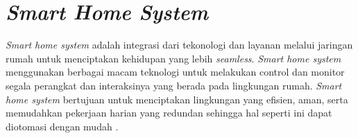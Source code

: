 \section{\textit{Smart Home System}}

\textit{Smart home system} adalah integrasi dari tekonologi dan layanan melalui jaringan rumah untuk menciptakan kehidupan yang lebih \textit{seamless}. \textit{Smart home system} menggunakan berbagai macam teknologi untuk melakukan control dan monitor segala perangkat dan interaksinya yang berada pada lingkungan rumah. \textit{Smart home system} bertujuan untuk menciptakan lingkungan yang efisien, aman, serta memudahkan pekerjaan harian yang redundan sehingga hal seperti ini dapat diotomasi dengan mudah \parencite{kadam2015smart}.

